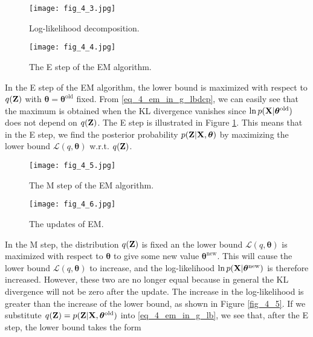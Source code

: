 \documentclass[../book-template.tex]{subfiles}
\begin{document}
\begin{figure}[h]
	\centering
	\begin{minipage}[t]{0.42\linewidth}
		\centering
		\texttt{[image: fig\_4\_3.jpg]}
		\caption{Log-likelihood decomposition.}\label{fig_4_3}
	\end{minipage}
	\begin{minipage}[t]{0.48\linewidth}       
		\centering
		\texttt{[image: fig\_4\_4.jpg]}
		\caption{The E step of the EM algorithm.}\label{fig_4_4}
	\end{minipage}
\end{figure}
\par In the E step of the EM algorithm, the lower bound is maximized with respect to $q({\bf Z})$ with $\bm{\theta}=\bm{\theta}^{\text{old}}$ fixed. From \eqref{eq_4_em_in_g_lbdcp}, we can easily see that the maximum is obtained when the KL divergence vanishes since $\ln p({\bf X}|\bm{\theta}^{\text{old}})$ does not depend on $q({\bf Z})$. The E step is illustrated in Figure \ref{fig_4_4}. This means that in the E step, we find the posterior probability $p({\bf Z}|{\bf X},\bm{\theta})$ by maximizing the lower bound $\mathcal{L}(q,\bm{\theta})$ w.r.t. $q({\bf Z})$.
\begin{figure}[h]
	\centering
	\begin{minipage}[t]{0.42\linewidth}
		\centering
		\texttt{[image: fig\_4\_5.jpg]}
		\caption{The M step of the EM algorithm.}\label{fig_4_5}
	\end{minipage}
	\begin{minipage}[t]{0.48\linewidth}       
		\centering
		\texttt{[image: fig\_4\_6.jpg]}
		\caption{The updates of EM.}\label{fig_4_6}
	\end{minipage}
\end{figure}
\par In the M step, the distribution $q({\bf Z})$ is fixed an the lower bound $\mathcal{L}(q,\bm{\theta})$ is maximized with respect to $\bm{\theta}$ to give some new value $\bm{\theta}^{\text{new}}$. This will cause the lower bound $\mathcal{L}(q,\bm{\theta})$ to increase, and the log-likelihood $\ln p({\bf X}|\bm{\theta}^{\text{new}})$ is therefore increased. However, these two are no longer equal because in general the KL divergence will not be zero after the update. The increase in the log-likelihood is greater than the increase of the lower bound, as shown in Figure \ref{fig_4_5}. If we substitute $q({\bf Z})=p({\bf Z}|{\bf X}, \bm{\theta}^{\text{old}})$ into \eqref{eq_4_em_in_g_lb}, we see that, after the E step, the lower bound takes the form
\end{document}
